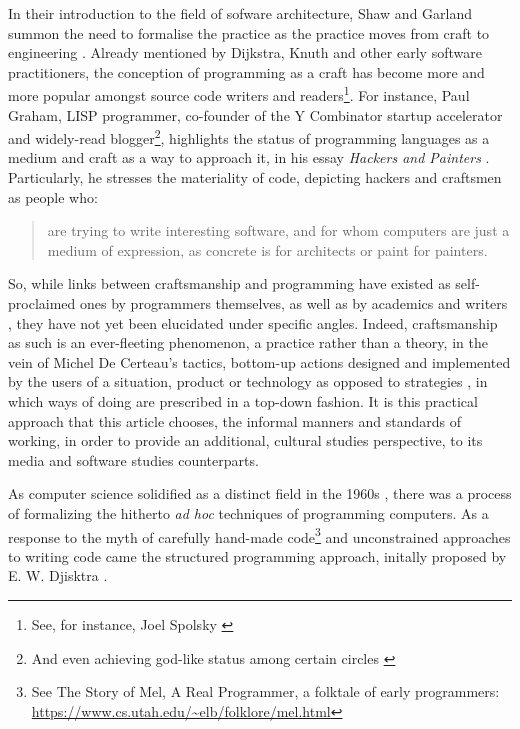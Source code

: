In their introduction to the field of sofware architecture, Shaw and Garland summon the need to formalise the practice as the practice moves from craft to engineering \citep{shaw_software_1996}. Already mentioned by Dijkstra, Knuth and other early software practitioners, the conception of programming as a craft has become more and more popular amongst source code writers and readers\footnote{See, for instance, Joel Spolsky \citep{spolosky_craftsmanship_2003,seibel_coders_2009}}.  For instance, Paul Graham, LISP programmer, co-founder of the Y Combinator startup accelerator and widely-read blogger\footnote{And even achieving god-like status among certain circles \citep{eadicicco_startup_2014}}, highlights the status of programming languages as a medium and craft as a way to approach it, in his essay \emph{Hackers and Painters} \citep{graham_hackers_2003}. Particularly, he stresses the materiality of code, depicting hackers and craftsmen as people who:

\begin{quote}
  are trying to write interesting software, and for whom computers are just a medium of expression, as concrete is for architects or paint for painters.
\end{quote}

So, while links between craftsmanship and programming have existed as self-proclaimed ones by programmers themselves, as well as by academics and writers  \citep{sennett_craftsman_2009,chandra_geek_2014}, they have not yet been elucidated under specific angles. Indeed, craftsmanship as such is an ever-fleeting phenomenon, a practice rather than a theory, in the vein of Michel De Certeau's tactics, bottom-up actions designed and implemented by the users of a situation, product or technology as opposed to strategies \citep{certeau_invention_1990}, in which ways of doing are prescribed in a top-down fashion. It is this practical approach that this article chooses, the informal manners and standards of working, in order to provide an additional, cultural studies perspective, to its media and software studies counterparts.

As computer science solidified as a distinct field in the 1960s \citep{tedre_development_2006}, there was a process of formalizing the hitherto \emph{ad hoc} techniques of programming computers. As a response to the myth of carefully hand-made code\footnote{See The Story of Mel, A Real Programmer, a folktale of early programmers: \url{https://www.cs.utah.edu/~elb/folklore/mel.html}} and unconstrained approaches to writing code came the structured programming approach, initally proposed by E. W. Djisktra \citep{dijkstra_chapter_1972}. 

